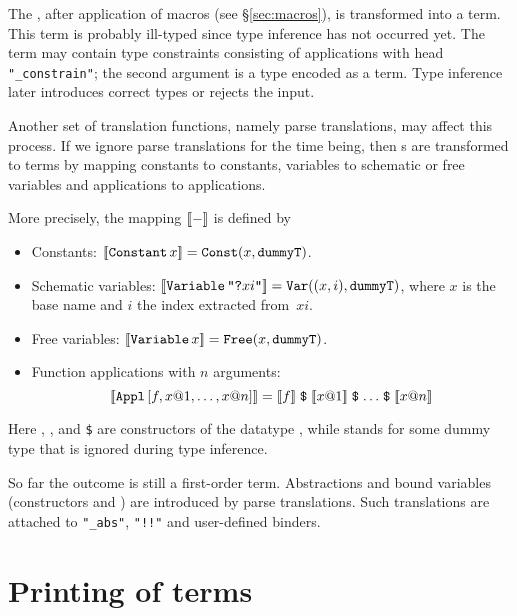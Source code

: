 The \AST{}, after application of macros (see \S\ref{sec:macros}), is
transformed into a term.  This term is probably ill-typed since type
inference has not occurred yet.  The term may contain type constraints
consisting of applications with head {\tt "_constrain"}; the second
argument is a type encoded as a term.  Type inference later introduces
correct types or rejects the input.

Another set of translation functions, namely parse
translations, may affect this process.  If we
ignore parse translations for the time being, then \AST{}s are transformed
to terms by mapping \AST{} constants to constants, \AST{} variables to
schematic or free variables and \AST{} applications to applications.

More precisely, the mapping $\mathopen{[\![}-\mathclose{]\!]}$ is defined by
\begin{itemize}
\item Constants: $\mathopen{[\![}\mathop{\mbox{\tt Constant}}\nolimits x\mathclose{]\!]} = \mathop{\mbox{\tt Const}}\nolimits (x,
  \mbox{\tt dummyT})$.

\item Schematic variables: $\mathopen{[\![}\mathop{\mbox{\tt Variable}}\nolimits \mbox{\tt "?}xi\mbox{\tt "}\mathclose{]\!]} =
  \mathop{\mbox{\tt Var}}\nolimits ((x, i), \mbox{\tt dummyT})$, where $x$ is the base name and $i$
  the index extracted from~$xi$.

\item Free variables: $\mathopen{[\![}\mathop{\mbox{\tt Variable}}\nolimits x\mathclose{]\!]} = \mathop{\mbox{\tt Free}}\nolimits (x,
  \mbox{\tt dummyT})$.

\item Function applications with $n$ arguments:
    \[ \termofast{\Appl{f, x@1, \ldots, x@n}} =
       \termofast{f} \ttapp
         \termofast{x@1} \ttapp \ldots \ttapp \termofast{x@n}
    \]
\end{itemize}
Here , ,  and
\verb|$| are constructors of the datatype ,
while  stands for some dummy type that is ignored during
type inference.

So far the outcome is still a first-order term.  Abstractions and bound
variables (constructors  and ) are introduced
by parse translations.  Such translations are attached to {\tt "_abs"},
{\tt "!!"} and user-defined binders.


\section{Printing of terms}
\newcommand\astofterm[1]{\lbrakk#1\rbrakk}

